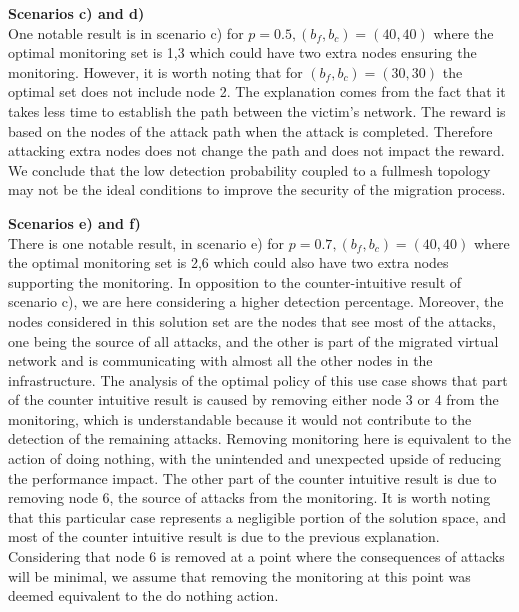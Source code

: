\textbf{Scenarios c) and d)\\}
One notable result is in scenario c) for $p=0.5,  (b_f,b_c) = (40,40)$ where the optimal monitoring set is 1,3 which could have two extra nodes ensuring the monitoring. However, it is worth noting that for $(b_f,b_c)=(30,30)$ the optimal set does not include node 2. The explanation comes from the fact that it takes less time to establish the path between the victim's network. The reward is based on the nodes of the attack path when the attack is completed. Therefore attacking extra nodes does not change the path and does not impact the reward. We conclude that the low detection probability coupled to a fullmesh topology may not be the ideal conditions to improve the security of the migration process.


\textbf{Scenarios e) and f)}\\
There is one  notable result, in scenario e) for $p=0.7,  (b_f,b_c) = (40,40)$ where the optimal monitoring set is 2,6 which could also have two extra nodes supporting the monitoring. In opposition to the counter-intuitive result of scenario c), we are here considering a higher detection percentage. Moreover, the nodes considered in this solution set are the nodes that see most of the attacks, one being the source of all attacks, and the other is part of the migrated virtual network and is communicating with almost all the other nodes in the infrastructure. The analysis of the optimal policy of this use case shows that part of the counter intuitive result is caused by removing either node 3 or 4 from the monitoring, which is understandable because it would not contribute to the detection of the remaining attacks. Removing monitoring here is equivalent to the action of doing nothing, with the unintended and unexpected upside of reducing the performance impact.
The other part of the counter intuitive result is due to removing node 6, the source of attacks from the monitoring. It is worth noting that this particular case represents a negligible portion of the solution space, and most of the counter intuitive result is due to the previous explanation. Considering that node 6 is removed at a point where the consequences of attacks will be minimal, we assume that removing the monitoring at this point was deemed equivalent to the do nothing action.


